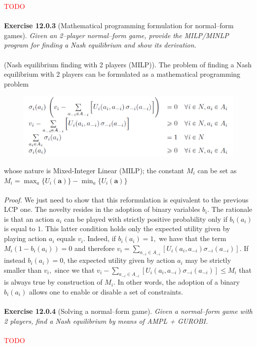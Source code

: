 \textcolor{red}{TODO}\\\\
\textbf{Exercise 12.0.3} (Mathematical programming formulation for normal–form games). \textit{Given an 2–player normal–form game, provide the MILP/MINLP program for finding a Nash equilibrium and show its derivation.}\\\\
(Nash equilibrium finding with 2 players (MILP)). The problem of finding a Nash equilibrium with 2 players can be formulated as a mathematical programming problem
\begin{figure}[H]
\centering
\includegraphics[width=\textwidth]{images/img_2_12_02.png}
\end{figure}
\noindent
whose nature is Mixed-Integer Linear (MILP); the constant $M_i$ can be set as $M_i = \max_{a}\{U_i (\mathbf{a})\} - \min_{a}\{U_i (\mathbf{a})\}$\\\\
\textit{Proof.} We just need to show that this reformulation is equivalent to the previous LCP one. The novelty resides in the adoption of binary variables $b_{i}$. The rationale is that an action $a_{i}$ can be played with strictly positive probability only if $b_{i}\left(a_{i}\right)$ is equal to $1 .$ This latter condition holds only the expected utility given by playing action $a_{i}$ equals $v_{i}$. Indeed, if $b_{i}\left(a_{i}\right)=1,$ we have that the term $M_{i}\left(1-b_{i}\left(a_{i}\right)\right)=0$ and therefore
$v_{i}=\sum_{a_{-i} \in A_{-i}}\left[U_{i}\left(a_{i}, a_{-i}\right) \sigma_{-i}\left(a_{-i}\right)\right]$. If instead $b_{i}\left(a_{i}\right)=0$, the expected utility given by action $a_{i}$ may be strictly
smaller than $v_{i},$ since we that $v_{i}-\sum_{a_{-i} \in A_{-i}}\left[U_{i}\left(a_{i}, a_{-i}\right) \sigma_{-i}\left(a_{-i}\right)\right] \leqslant M_{i}$ that is always true by construction of
$M_{i} .$ In other words, the adoption of a binary $b_{i}\left(a_{i}\right)$ allows one to enable or disable a set of constraints.\\\\
\textbf{Exercise 12.0.4} (Solving a normal–form game). \textit{Given a normal–form game with 2 players, find a Nash equilibrium by means of AMPL + GUROBI.}\\\\
\textcolor{red}{TODO}\\\\

